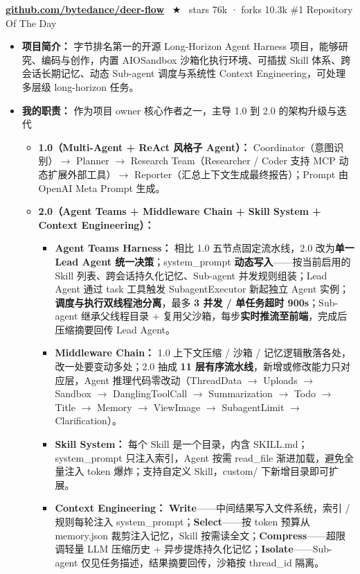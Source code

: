 \documentclass[10pt]{article}
\newcommand{\code}[1]{\colorbox{codegray}{\small\ttfamily #1}}
\begin{document}
\textbf{\href{https://github.com/bytedance/deer-flow}{github.com/bytedance/deer-flow}} ~$\bigstar$~ stars 76k · forks 10.3k \hfill {\small\color{gray!140}\#1 Repository Of The Day}
\begin{itemize}
\item \textbf{项目简介：} 字节排名第一的开源 Long-Horizon Agent Harness 项目，能够研究、编码与创作，内置 AIOSandbox 沙箱化执行环境、可插拔 Skill 体系、跨会话长期记忆、动态 Sub-agent 调度与系统性 Context Engineering，可处理多层级 long-horizon 任务。
\item \textbf{我的职责：} 作为项目 owner 核心作者之一，主导 1.0 到 2.0 的架构升级与迭代
  \begin{itemize}[label=$\circ$]
  \item \textbf{1.0（Multi-Agent + ReAct 风格子 Agent）：} Coordinator（意图识别）$\rightarrow$ Planner $\rightarrow$ Research Team（Researcher / Coder 支持 MCP 动态扩展外部工具）$\rightarrow$ Reporter（汇总上下文生成最终报告）；Prompt 由 OpenAI Meta Prompt 生成。
  \item \textbf{2.0（Agent Teams + Middleware Chain + Skill System + Context Engineering）：}
    \begin{itemize}[label={\raisebox{0.15ex}{\scriptsize$\blacksquare$}}]
    \item \textbf{Agent Teams Harness：} 相比 1.0 五节点固定流水线，2.0 改为\textbf{单一 Lead Agent 统一决策}；\code{system\_prompt} \textbf{动态写入}——按当前启用的 Skill 列表、跨会话持久化记忆、Sub-agent 并发规则组装；Lead Agent 通过 \code{task} 工具触发 SubagentExecutor 新起独立 Agent 实例；\textbf{调度与执行双线程池分离}，最多 \textbf{3 并发 / 单任务超时 900s}；Sub-agent 继承父线程目录 + 复用父沙箱，每步\textbf{实时推流至前端}，完成后压缩摘要回传 Lead Agent。
    \item \textbf{Middleware Chain：} 1.0 上下文压缩 / 沙箱 / 记忆逻辑散落各处，改一处要变动多处；2.0 抽成 \textbf{11 层有序流水线}，新增或修改能力只对应层，Agent 推理代码零改动（ThreadData $\rightarrow$ Uploads $\rightarrow$ Sandbox $\rightarrow$ DanglingToolCall $\rightarrow$ Summarization $\rightarrow$ Todo $\rightarrow$ Title $\rightarrow$ Memory $\rightarrow$ ViewImage $\rightarrow$ SubagentLimit $\rightarrow$ Clarification）。
    \item \textbf{Skill System：} 每个 Skill 是一个目录，内含 \code{SKILL.md}；\code{system\_prompt} 只注入索引，Agent 按需 \code{read\_file} 渐进加载，避免全量注入 token 爆炸；支持自定义 Skill，\code{custom/} 下新增目录即可扩展。
    \item \textbf{Context Engineering：} \textbf{Write}——中间结果写入文件系统，索引 / 规则每轮注入 \code{system\_prompt}；\textbf{Select}——按 token 预算从 \code{memory.json} 裁剪注入记忆，Skill 按需读全文；\textbf{Compress}——超限调轻量 LLM 压缩历史 + 异步提炼持久化记忆；\textbf{Isolate}——Sub-agent 仅见任务描述，结果摘要回传，沙箱按 \code{thread\_id} 隔离。
    \end{itemize}
  \end{itemize}
\end{itemize}
\end{document}
